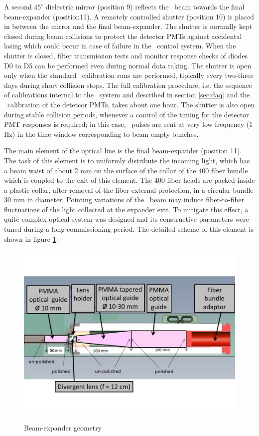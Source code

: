 A second $45^{\circ}$ dielectric mirror (position 9) reflects the \laser~beam towards
the final beam-expander (position11). A remotely controlled shutter (position 10) is
placed in between the mirror and the final beam-expander. The shutter is normally
kept closed during beam collisions to protect the detector PMTs against accidental
lasing which could occur in case of failure in the \laser~control system. When the
shutter is closed, filter transmission tests and monitor response checks of diodes
D0 to D5 can be performed even during normal data taking. The shutter is open only
when the standard \laser~calibration runs are performed, tipically every two-three
days during short collision stops. The full calibration procedure, i.e. the sequence
of calibrations internal to the \laser~system and described in section \ref{sec:daq} and the
\laser~calibration of the detetcor PMTs, takes about one hour. The shutter is also
open during stable collision periods, whenever a control of the timing for the
detector PMT responses is required; in this case, \laser~pulses are sent at very low
frequency (1 Hz) in the time window corresponding to
beam empty bunches. 

The main element of the optical line is the final beam-expander (position 11). The
task of this element is to uniformly distribute the incoming light, which has a
beam waist of about 2 mm on the surface of the collar of the 400 fiber bundle which
is coupled to the exit of this element. The 400 fiber heads are packed inside a
plastic collar, after removal of the fiber external protection, in a circular bundle
30 mm in diameter. Pointing variations of the \laser~beam may induce fiber-to-fiber fluctuations of the light collected at the expander exit. To mitigate this effect, a quite complex optical system was designed and its constructive parameters were tuned
during a long commissioning period.  The detailed scheme of this element is shown in
figure \ref{fig:x.4}.
% 
\begin{figure}[htb]
\begin{center} 
\includegraphics[width=13cm, height=9cm]{figures/Beam_expander}
\caption{Beam-expander geometry
}\label{fig:x.4}
\end{center}
\end{figure}
%

